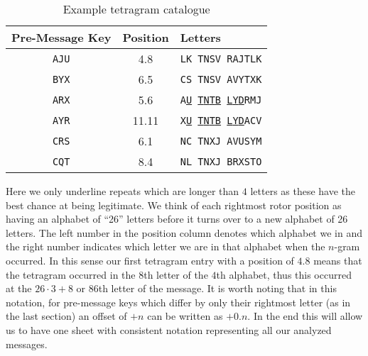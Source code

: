   \begin{table}[h!]
    \centering
    \begin{tabular}{|c|c|l|}
      \hline
      \textbf{Pre-Message Key} & \textbf{Position} & \textbf{Letters}
      \\
      \hline
      \texttt{AJU}             & 4.8               & \texttt{LK TNSV
      RAJTLK}
      \\
      \texttt{BYX}             & 6.5               & \texttt{CS TNSV
      AVYTXK}
      \\
      \texttt{ARX}             & 5.6               &
      \texttt{A}{\uline{\texttt{U}}}\texttt{
      }{\uline{\texttt{T}}}\texttt{}{\uline{\texttt{N}}}\texttt{}{\uline{\texttt{T}}}\texttt{}{\uline{\texttt{B}}}\texttt{
      }{\uline{\texttt{L}}}\texttt{}{\uline{\texttt{Y}}}\texttt{}{\uline{\texttt{D}}}\texttt{RMJ}
      \\
      \texttt{AYR}             & 11.11             &
      \texttt{X}{\uline{\texttt{U}}}\texttt{
      }{\uline{\texttt{T}}}\texttt{}{\uline{\texttt{N}}}\texttt{}{\uline{\texttt{T}}}\texttt{}{\uline{\texttt{B}}}\texttt{
      }{\uline{\texttt{L}}}\texttt{}{\uline{\texttt{Y}}}\texttt{}{\uline{\texttt{D}}}\texttt{ACV}
      \\
      \texttt{CRS}             & 6.1               & \texttt{NC TNXJ
      AVUSYM}
      \\
      \texttt{CQT}             & 8.4               &
      \texttt{}{\texttt{N}}\texttt{L TNXJ BRXSTO}
      \\
      \hline
    \end{tabular}
    \caption{Example tetragram catalogue}
  \end{table}
  \noindent Here we only underline repeats which are longer than $4$
  letters as these have the best chance at being legitimate. We think
  of each rightmost rotor position as having an alphabet of ``26''
  letters before it turns over to a new alphabet of 26 letters. The
  left number in the position column denotes which alphabet we in and
  the right number indicates which letter we are in that alphabet
  when the $n$-gram occurred. In this sense our first tetragram entry
  with a position of $4.8$ means that the tetragram occurred in the
  $8$th letter of the $4$th alphabet, thus this occurred at the
  $26\cdot3 + 8$ or $86$th letter of the message. It is worth noting
  that in this notation, for pre-message keys which differ by only
  their rightmost letter (as in the last section) an offset of $+n$
  can be written as $+0.n$. In the end this will allow us to have one
  sheet with consistent notation representing all our analyzed messages.

